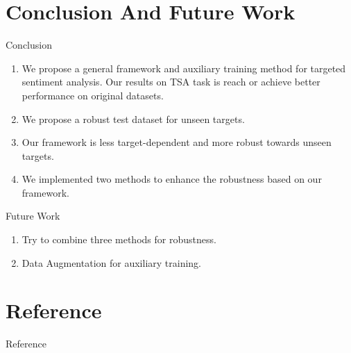 \documentclass[xcolor=dvipsnames]{beamer}
\begin{document}
\section{Conclusion And Future Work}
\begin{frame}{Conclusion}
  \begin{enumerate}
    \item We propose a general framework and auxiliary training method for targeted sentiment analysis. Our results on TSA task is reach or achieve better performance on original datasets.
    \item We propose a robust test dataset for unseen targets.
    \item Our framework is less target-dependent and more robust towards unseen targets.
    \item We implemented two methods to enhance the robustness based on our framework.

  \end{enumerate}
\end{frame}

\begin{frame}{Future Work}
  \begin{enumerate}
    \item 
    {
     Try to combine three methods for robustness.
    }
    \item 
    {
      Data Augmentation for auxiliary training.
    }
  \end{enumerate}
\end{frame}
\section*{Reference}
\tiny
\nocite{*}
\begin{frame}[allowframebreaks]{Reference}




\end{frame}
\end{document}
